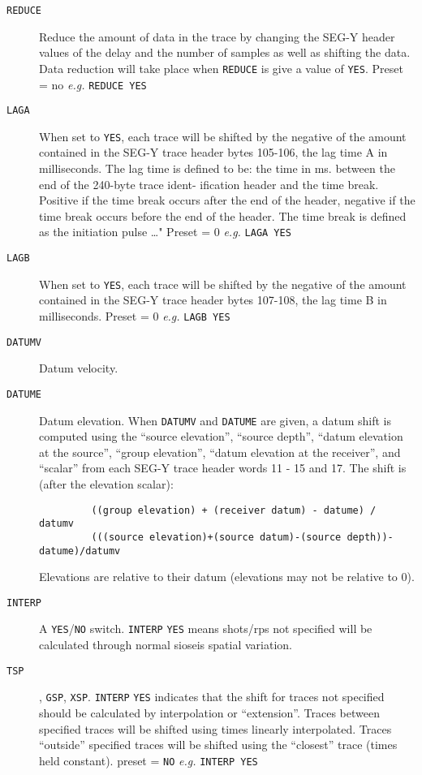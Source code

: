 \begin{description}
\item[\texttt{REDUCE}] Reduce the amount of data in the trace by changing the SEG-Y
         header values of the delay and the number of samples as well as
         shifting the data.  Data reduction will take place when \texttt{REDUCE}
         is give a value of \texttt{YES}.
         Preset = no     \textit{e.g.}   \texttt{REDUCE YES}

\item[\texttt{LAGA}] When set to \texttt{YES}, each trace will be shifted by the negative
         of the amount contained in the SEG-Y trace header bytes 105-106,
         the lag time A in milliseconds.  The lag time is defined to be:
         the time in ms. between the end of the 240-byte trace ident-
         ification header and the time break.  Positive if the time
         break occurs after the end of the header, negative if the time
         break occurs before the end of the header. The time break is
         defined as the initiation pulse \ldots"
         Preset = 0              \textit{e.g.}   \texttt{LAGA YES}

\item[\texttt{LAGB}] When set to \texttt{YES}, each trace will be shifted by the negative
         of the amount contained in the SEG-Y trace header bytes
         107-108, the lag time B in milliseconds.
         Preset = 0              \textit{e.g.}   \texttt{LAGB YES}

\item[\texttt{DATUMV}] Datum velocity.
\item[\texttt{DATUME}] Datum elevation.
         When \texttt{DATUMV} and \texttt{DATUME} are given, a datum shift is computed
         using the ``source elevation'', ``source depth'', ``datum elevation at the source'', ``group elevation'', ``datum elevation at the receiver'', and ``scalar'' from each SEG-Y trace header words
         11 - 15 and 17.  The shift is (after the elevation scalar):
\begin{verbatim}
         ((group elevation) + (receiver datum) - datume) / datumv
         (((source elevation)+(source datum)-(source depth))-datume)/datumv
\end{verbatim}
         Elevations are relative to their datum (elevations may not
         be relative to 0).

     \item[\texttt{INTERP}] A \texttt{YES}/\texttt{NO} switch.  \texttt{INTERP} \texttt{YES} means \glspl{shot}/\glspl{rp} not specified
         will be calculated through normal sioseis spatial variation.
\item[\texttt{TSP}] , \texttt{GSP}, \texttt{XSP}.  \texttt{INTERP} \texttt{YES} indicates that the shift for traces not
         specified should be calculated by interpolation or ``extension''.
         Traces between specified traces will be shifted using times
         linearly interpolated.  Traces ``outside'' specified traces will
         be shifted using the ``closest'' trace (times held constant).
         \Gls{preset} = \texttt{NO}    \textit{e.g.}  \texttt{INTERP YES}


\end{description}
